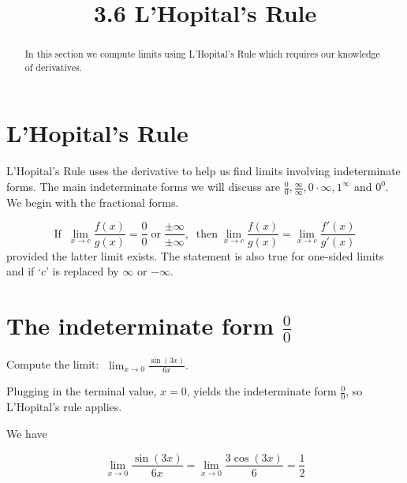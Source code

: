 \documentclass[handout]{ximera}
\title{3.6 L'Hopital's Rule}
\begin{document}
\begin{abstract}
In this section we compute limits using L'Hopital's Rule which requires our knowledge of derivatives.
\end{abstract}

\maketitle

\section{L'Hopital's Rule}

L'Hopital's Rule uses the derivative to help us find limits involving indeterminate forms. 
The main indeterminate forms we will discuss are $\frac 00, \frac{\infty}{\infty}, 0\cdot \infty, 1^\infty$ and $0^0$. We begin with the fractional forms.

\begin{theorem}

\[
\text{If} \;\; \lim_{x \to c} \frac{f(x)}{g(x)} = \frac{0}{0} \; \text{or} \; \frac{\pm \infty}{\pm \infty},
\;\;\text{then} \; \lim_{x \to c} \frac{f(x)}{g(x)} = \lim_{x \to c} \frac{f'(x)}{g'(x)}
\]
 provided the latter limit exists. The statement is also true for one-sided limits 
 and if `$c$' is replaced by $\infty$ or $-\infty$.
\end{theorem}



\section{The indeterminate form $\frac00$}


\begin{example}[example 1]
Compute the limit: $\displaystyle{\;\lim_{x \to 0} \frac{\sin(3x)}{6x}}.$

Plugging in the terminal value, $x=0$, yields 
the indeterminate form $\frac00$, so L'Hopital's rule applies.

We have 

\[
\lim_{x \to 0} \frac{\sin(3x)}{6x} = \lim_{x \to 0} \frac{3\cos(3x)}{6} = \frac12
\]
\end{example}
\end{document}
